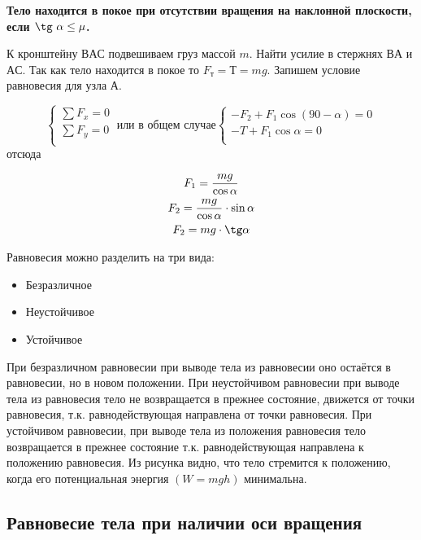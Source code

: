 \documentclass[a6paper, 11pt]{diss_4}
\renewcommand{\'}{\,'}
\begin{document}
\textbf{Тело находится в покое при отсутствии вращения на наклонной плоскости, если $\tg\ \alpha\leq\mu$.}

К кронштейну $ВАС$ подвешиваем груз массой $m$. Найти усилие в стержнях $ВА$ и $АС$.
Так как тело находится в покое то $F_т=Т= mg$. Запишем условие равновесия для узла $А$.

\begin{equation*}
     \left\{
          \begin{array}{lr}
            \sum F_x=0\\
            \sum F_y=0\\
          \end{array}
     \right.\ \text{или в общем случае}
     \left\{
          \begin{array}{lr}
            -F_2+F_1\cos (90-\alpha)=0\\
            -T+F_1\cos\alpha=0\\
          \end{array}
     \right.
\end{equation*}
отсюда

\begin{gather*}
F_1=\frac{mg}{\cos\alpha}\\
F_2=\frac{mg}{\cos\alpha}\cdot\sin\alpha\\
F_2=mg\cdot\tg\alpha
\end{gather*}


Равновесия  можно разделить на три вида:
\begin{itemize}
  \item Безразличное
  \item Неустойчивое
  \item Устойчивое
\end{itemize}

 При безразличном равновесии при выводе тела из равновесии оно остаётся в
равновесии, но в новом положении. При неустойчивом равновесии при выводе тела
из равновесия тело не возвращается в прежнее состояние, движется от точки
равновесия, т.к. равнодействующая направлена от точки равновесия. При
устойчивом равновесии, при выводе тела из положения равновесия тело
возвращается в прежнее состояние т.к. равнодействующая направлена к положению
равновесия. Из рисунка видно, что тело стремится к положению, когда его
потенциальная энергия $(W=mgh)$ минимальна.

\subsection{Равновесие тела при  наличии оси вращения}
\end{document}
